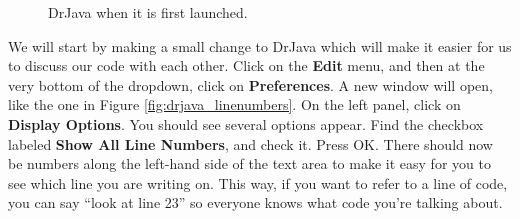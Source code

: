 \begin{figure}
    \centering
    \caption{DrJava when it is first launched.}
    \label{fig:drjava_fresh}
\end{figure}

We will start by making a small change to DrJava which will make it easier for us to discuss our code with each other. Click on the \textbf{Edit} menu, and then at the very bottom of the dropdown, click on \textbf{Preferences}. A new window will open, like the one in Figure \ref{fig:drjava_linenumbers}. On the left panel, click on \textbf{Display Options}. You should see several options appear. Find the checkbox labeled \textbf{Show All Line Numbers}, and check it. Press OK. There should now be numbers along the left-hand side of the text area to make it easy for you to see which line you are writing on. This way, if you want to refer to a line of code, you can say ``look at line 23'' so everyone knows what code you're talking about.  

